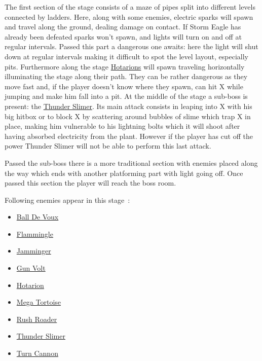 The first section of the stage consists of a maze of pipes split into different levels connected by ladders. Here, along with some enemies, electric sparks will spawn and travel along the ground, dealing damage on contact. If Storm Eagle has already been defeated sparks won't spawn, and lights will turn on and off at regular intervals. Passed this part a dangerous one awaits: here the light will shut down at regular intervals making it difficult to spot the level layout, especially pits. Furthermore along the stage  \hyperlink{enem:Hotarion}{Hotarions} will spawn traveling horizontally illuminating the stage along their path. They can be rather dangerous as they move fast and, if the player doesn't know where they spawn, can hit X while jumping and make him fall into a pit.
At the middle of the stage a sub-boss is present: the \hyperlink{miniboss:Thunder_Slimer}{Thunder Slimer}. Its main attack consists in leaping into X with his big hitbox or to block X by scattering around bubbles of slime which trap X in place, making him vulnerable to his lightning bolts which it will shoot after having absorbed electricity from the plant. However if the player has cut off the power Thunder Slimer will not be able to perform this last attack.

Passed the sub-boss there is a more traditional section with enemies placed along the way which ends with another platforming part with light going off. Once passed this section the player will reach the boss room.

Following enemies appear in this stage~\cite{wiki:Power_plant}:
\begin{itemize}
	\item \hyperlink{enem:Ball_De_Voux}{Ball De Voux}
	\item \hyperlink{enem:Flammingle}{Flammingle}
	\item \hyperlink{enem:Jamminger}{Jamminger}
	\item \hyperlink{enem:Gun_Volt}{Gun Volt}
	\item \hyperlink{enem:Hotarion}{Hotarion}
	\item \hyperlink{enem:Mega_Tortoise}{Mega Tortoise}
	\item \hyperlink{enem:Rush_Roader}{Rush Roader}
	\item \hyperlink{miniboss:Thunder_Slimer}{Thunder Slimer}
	\item \hyperlink{enem:Turn_Cannon}{Turn Cannon}
\end{itemize}


